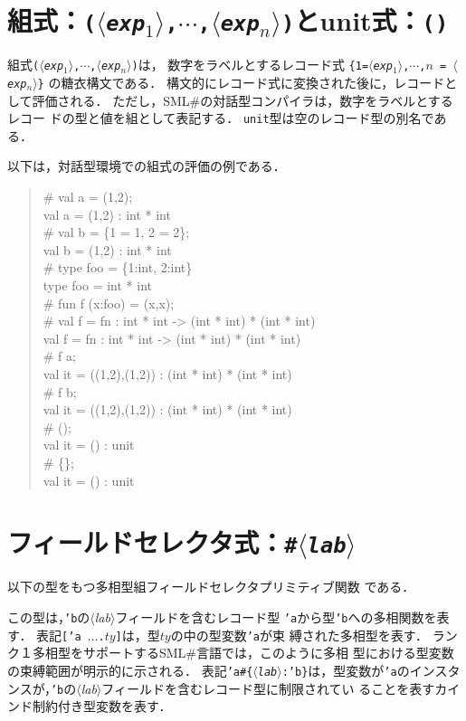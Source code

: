 \documentclass{jbook}
\newcommand{\smlsharp}{SML\#}
\newcommand{\code}[1]{\mbox{\large\tt #1}}
\newcommand{\nonterm}[1]{\mbox{$\langle$}{\it #1}\mbox{$\rangle$}}
\newcommand{\term}[1]{\mbox{{\tt #1}}}
\newenvironment{program}{\begin{quote}\begin{tt}}%
                        {\end{tt}\end{quote}}
\begin{document}
\section{組式：\term{(\nonterm{exp$_1$},$\cdots$,\nonterm{exp$_n$})}とunit式：\term{()}}

	組式\term{(\nonterm{exp$_1$},$\cdots$,\nonterm{exp$_n$})}は，
数字をラベルとするレコード式
\term{\{1=\nonterm{exp$_1$},$\cdots$,$n$ = \nonterm{exp$_n$}\}}
の糖衣構文である．
	構文的にレコード式に変換された後に，レコードとして評価される．
	ただし，\smlsharp{}の対話型コンパイラは，数字をラベルとするレコー
ドの型と値を組として表記する．
	\code{unit}型は空のレコード型の別名である．

	以下は，対話型環境での組式の評価の例である．
\begin{program}
\# val a = (1,2);
\\
val a = (1,2) : int * int
\\
\# val b = \{1 = 1, 2 = 2\};
\\
val b = (1,2) : int * int
\\
\# type foo = \{1:int, 2:int\}
\\
type foo = int * int
\\
\# fun f (x:foo) = (x,x);
\\
\# val f = fn : int * int -> (int * int) * (int * int)
\\
val f = fn : int * int -> (int * int) * (int * int)
\\
\# f a;
\\
val it = ((1,2),(1,2)) : (int * int) * (int * int)
\\
\# f b;
\\
val it = ((1,2),(1,2)) : (int * int) * (int * int)
\\
\# ();
\\
val it = () : unit
\\
\# \{\};
\\
val it = () : unit
\end{program}

\section{フィールドセレクタ式：\term{\#\nonterm{lab}}}

	以下の型をもつ多相型組フィールドセレクタプリミティブ関数
である． 
\begin{program}
 ['a\#\{\nonterm{lab}:'b\}, 'b. 'a -> 'b]
\end{program}
	この型は，\code{'b}の\nonterm{lab}フィールドを含むレコード型
\code{'a}から型\code{'b}への多相関数を表す．
	表記\code{['a $\ldots$.$ty$]}は，型$ty$の中の型変数\code{'a}が束
縛された多相型を表す．
	ランク１多相型をサポートする\smlsharp{}言語では，このように多相
型における型変数の束縛範囲が明示的に示される．
	表記\code{'a\#\{\nonterm{lab}:'b\}}は，型変数が\code{'a}のインスタ
ンスが，\code{'b}の\nonterm{lab}フィールドを含むレコード型に制限されてい
ることを表すカインド制約付き型変数を表す．
\end{document}
